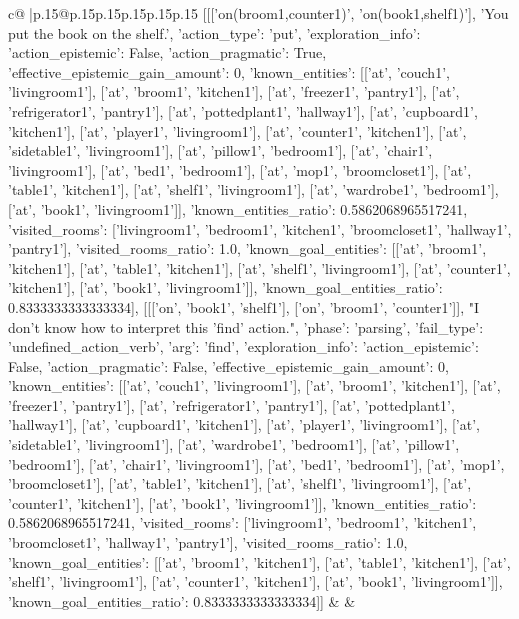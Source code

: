 \documentclass{article}
\begin{document}
{\begin{supertabular}{c@{$\;$}|p{.15\linewidth}@{}p{.15\linewidth}p{.15\linewidth}p{.15\linewidth}p{.15\linewidth}p{.15\linewidth}}
{{{	 [[['on(broom1,counter1)', 'on(book1,shelf1)'], 'You put the book on the shelf.', {'action_type': 'put', 'exploration_info': {'action_epistemic': False, 'action_pragmatic': True, 'effective_epistemic_gain_amount': 0, 'known_entities': [['at', 'couch1', 'livingroom1'], ['at', 'broom1', 'kitchen1'], ['at', 'freezer1', 'pantry1'], ['at', 'refrigerator1', 'pantry1'], ['at', 'pottedplant1', 'hallway1'], ['at', 'cupboard1', 'kitchen1'], ['at', 'player1', 'livingroom1'], ['at', 'counter1', 'kitchen1'], ['at', 'sidetable1', 'livingroom1'], ['at', 'pillow1', 'bedroom1'], ['at', 'chair1', 'livingroom1'], ['at', 'bed1', 'bedroom1'], ['at', 'mop1', 'broomcloset1'], ['at', 'table1', 'kitchen1'], ['at', 'shelf1', 'livingroom1'], ['at', 'wardrobe1', 'bedroom1'], ['at', 'book1', 'livingroom1']], 'known_entities_ratio': 0.5862068965517241, 'visited_rooms': ['livingroom1', 'bedroom1', 'kitchen1', 'broomcloset1', 'hallway1', 'pantry1'], 'visited_rooms_ratio': 1.0, 'known_goal_entities': [['at', 'broom1', 'kitchen1'], ['at', 'table1', 'kitchen1'], ['at', 'shelf1', 'livingroom1'], ['at', 'counter1', 'kitchen1'], ['at', 'book1', 'livingroom1']], 'known_goal_entities_ratio': 0.8333333333333334}}], [[['on', 'book1', 'shelf1'], ['on', 'broom1', 'counter1']], "I don't know how to interpret this 'find' action.", {'phase': 'parsing', 'fail_type': 'undefined_action_verb', 'arg': 'find', 'exploration_info': {'action_epistemic': False, 'action_pragmatic': False, 'effective_epistemic_gain_amount': 0, 'known_entities': [['at', 'couch1', 'livingroom1'], ['at', 'broom1', 'kitchen1'], ['at', 'freezer1', 'pantry1'], ['at', 'refrigerator1', 'pantry1'], ['at', 'pottedplant1', 'hallway1'], ['at', 'cupboard1', 'kitchen1'], ['at', 'player1', 'livingroom1'], ['at', 'sidetable1', 'livingroom1'], ['at', 'wardrobe1', 'bedroom1'], ['at', 'pillow1', 'bedroom1'], ['at', 'chair1', 'livingroom1'], ['at', 'bed1', 'bedroom1'], ['at', 'mop1', 'broomcloset1'], ['at', 'table1', 'kitchen1'], ['at', 'shelf1', 'livingroom1'], ['at', 'counter1', 'kitchen1'], ['at', 'book1', 'livingroom1']], 'known_entities_ratio': 0.5862068965517241, 'visited_rooms': ['livingroom1', 'bedroom1', 'kitchen1', 'broomcloset1', 'hallway1', 'pantry1'], 'visited_rooms_ratio': 1.0, 'known_goal_entities': [['at', 'broom1', 'kitchen1'], ['at', 'table1', 'kitchen1'], ['at', 'shelf1', 'livingroom1'], ['at', 'counter1', 'kitchen1'], ['at', 'book1', 'livingroom1']], 'known_goal_entities_ratio': 0.8333333333333334}}]] 
	  } 
	   } 
	   } 
	 & & \\ 
 

    \theutterance {}  


\end{supertabular}}
\end{document}
